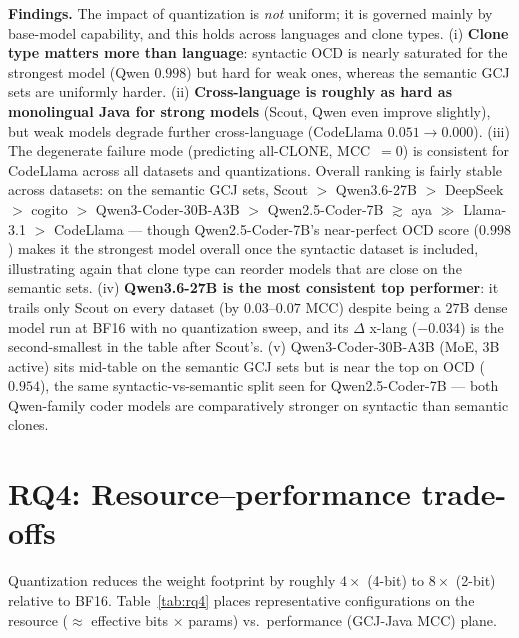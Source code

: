 \documentclass[11pt]{article}
\begin{document}
\noindent\textbf{Findings.} The impact of quantization is \emph{not} uniform;
it is governed mainly by base-model capability, and this holds across languages
and clone types. (i) \textbf{Clone type matters more than language}: syntactic
OCD is nearly saturated for the strongest model (Qwen $0.998$) but hard for weak
ones, whereas the semantic GCJ sets are uniformly harder. (ii)
\textbf{Cross-language is roughly as hard as monolingual Java for strong
models} (Scout, Qwen even improve slightly), but weak models degrade further
cross-language (CodeLlama $0.051\!\rightarrow\!0.000$). (iii) The degenerate
failure mode (predicting all-CLONE, MCC~$=0$) is consistent for CodeLlama across
all datasets and quantizations. Overall ranking is fairly stable across
datasets: on the semantic GCJ sets, Scout $>$ Qwen3.6-27B $>$ DeepSeek $>$
cogito $>$ Qwen3-Coder-30B-A3B $>$ Qwen2.5-Coder-7B $\gtrsim$ aya $\gg$
Llama-3.1 $>$ CodeLlama --- though Qwen2.5-Coder-7B's near-perfect OCD score
($0.998$) makes it the strongest model overall once the syntactic dataset is
included, illustrating again that clone type can reorder models that are
close on the semantic sets. (iv) \textbf{Qwen3.6-27B is the most consistent
top performer}: it trails only Scout on every dataset (by $0.03$--$0.07$ MCC)
despite being a $27$B dense model run at BF16 with no quantization sweep,
and its $\Delta$ x-lang ($-0.034$) is the second-smallest in the table after
Scout's. (v) Qwen3-Coder-30B-A3B (MoE, $3$B active) sits mid-table on the
semantic GCJ sets but is near the top on OCD ($0.954$), the same
syntactic-vs-semantic split seen for Qwen2.5-Coder-7B --- both Qwen-family
coder models are comparatively stronger on syntactic than semantic clones.

\section{RQ4: Resource--performance trade-offs}
Quantization reduces the weight footprint by roughly $4\times$ (4-bit) to
$8\times$ (2-bit) relative to BF16. Table~\ref{tab:rq4} places representative
configurations on the resource ($\approx$ effective bits $\times$ params) vs.\
performance (GCJ-Java MCC) plane.
\end{document}
